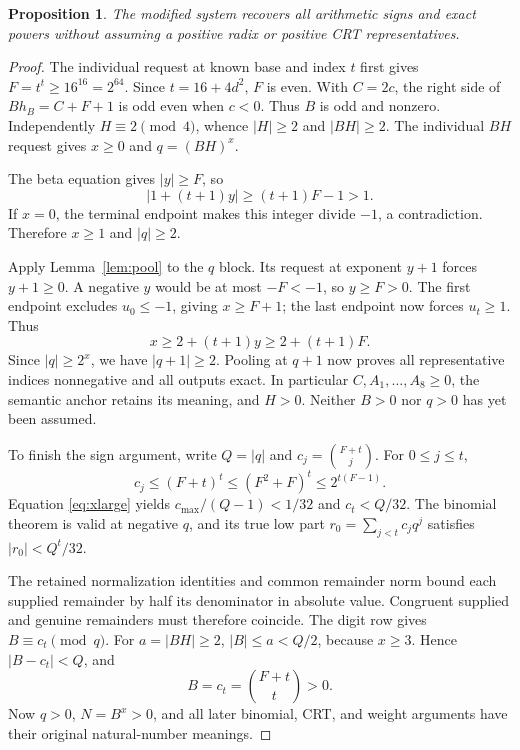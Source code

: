 \documentclass[11pt,letterpaper]{article}
\newtheorem{proposition}[theorem]{Proposition}
\theoremstyle{remark}
\begin{document}
\begin{proposition}\label{prop:bootstrap}
The modified system recovers all arithmetic signs and exact powers
without assuming a positive radix or positive CRT representatives.
\end{proposition}
\begin{proof}
The individual request at known base and index \(t\) first gives
\(F=t^t\ge16^{16}=2^{64}\). Since \(t=16+4d^2\), \(F\)
is even. With \(C=2c\), the right side of
\(Bh_B=C+F+1\) is odd even when \(c<0\). Thus \(B\) is
odd and nonzero. Independently \(H\equiv2\pmod4\), whence
\(|H|\ge2\) and \(|BH|\ge2\). The individual \(BH\) request
gives \(x\ge0\) and \(q=(BH)^x\).

The beta equation gives \(|y|\ge F\), so
\[
 |1+(t+1)y|\ge(t+1)F-1>1.
\]
If \(x=0\), the terminal endpoint makes this integer divide
\(-1\), a contradiction. Therefore \(x\ge1\) and \(|q|\ge2\).

Apply Lemma~\ref{lem:pool} to the \(q\) block. Its request at
exponent \(y+1\) forces \(y+1\ge0\). A negative \(y\) would
be at most \(-F<-1\), so \(y\ge F>0\).
The first endpoint excludes \(u_0\le-1\), giving \(x\ge F+1\);
the last endpoint now forces \(u_t\ge1\). Thus
\begin{equation}\label{eq:xlarge}
 x\ge2+(t+1)y\ge2+(t+1)F.
\end{equation}
Since \(|q|\ge2^x\), we have \(|q+1|\ge2\).
Pooling at \(q+1\) now proves all representative indices
nonnegative and all outputs exact. In particular
\(C,A_1,\ldots,A_8\ge0\), the semantic anchor retains its
meaning, and \(H>0\). Neither \(B>0\) nor \(q>0\) has
yet been assumed.

To finish the sign argument, write \(Q=|q|\) and
\(c_j=\binom{F+t}{j}\). For \(0\le j\le t\),
\[
 c_j\le(F+t)^t\le(F^2+F)^t\le2^{t(F-1)}.
\]
Equation \eqref{eq:xlarge} yields
\(c_{\max}/(Q-1)<1/32\) and \(c_t<Q/32\).
The binomial theorem is valid at negative \(q\), and its true low
part \(r_0=\sum_{j<t}c_jq^j\) satisfies \(|r_0|<Q^t/32\).

The retained normalization identities and common remainder norm
bound each supplied remainder by half its denominator in absolute
value. Congruent supplied and genuine remainders must therefore
coincide. The digit row gives \(B\equiv c_t\pmod q\).
For \(a=|BH|\ge2\), \(|B|\le a<Q/2\), because \(x\ge3\).
Hence \(|B-c_t|<Q\), and
\[
 B=c_t=\binom{F+t}{t}>0.
\]
Now \(q>0\), \(N=B^x>0\), and all later binomial, CRT, and
weight arguments have their original natural-number meanings.
\end{proof}
\end{document}
